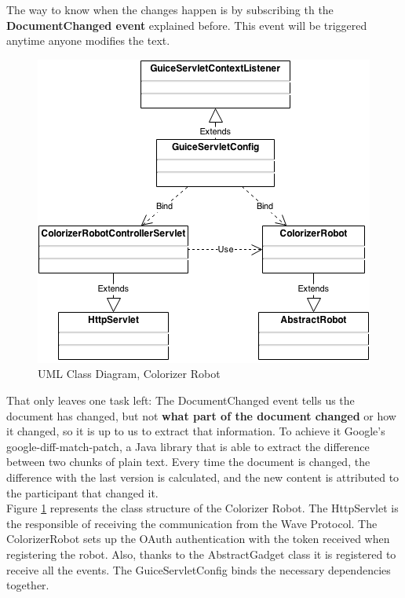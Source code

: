 The way to know when the changes happen is by subscribing th the \textbf{DocumentChanged event} explained before. This event will be triggered anytime anyone modifies the text.\\[.2cm]
\begin{figure}[H]
  \center
    \includegraphics[keepaspectratio, scale=0.5]{Media/Diagrams/Robot/Colorizer.png}
  \caption{UML Class Diagram, Colorizer Robot}
  \label{fig:colorizer_diagram}
\end{figure}
That only leaves one task left: The DocumentChanged event tells us the document has changed, but not \textbf{what part of the document changed} or how it changed, so it is up to us to extract that information. To achieve it Google's google-diff-match-patch, a Java library that is able to extract the difference between two chunks of plain text. Every time the document is changed, the difference with the last version is calculated, and the new content is attributed to the participant that changed it.\\[.2cm]
Figure \ref{fig:colorizer_diagram} represents the class structure of the Colorizer Robot. The HttpServlet is the responsible of receiving the communication from the Wave Protocol. The ColorizerRobot sets up the OAuth authentication with the token received when registering the robot. Also, thanks to the AbstractGadget class it is registered to receive all the events. The GuiceServletConfig binds the necessary dependencies together.

